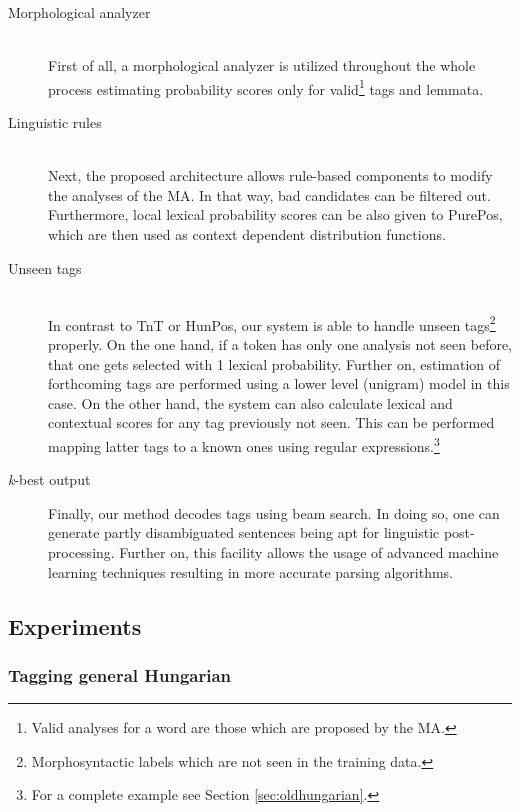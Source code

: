 \begin{description}
  \item[Morphological analyzer] \hfill \\
  First of all, a morphological analyzer is utilized throughout the whole process estimating probability scores only for valid\footnote{Valid analyses for a word are those which are proposed by the MA.} tags and lemmata.
  \item[Linguistic rules] \hfill \\
  Next, the proposed architecture allows rule-based components to modify the analyses of the MA. In that way, bad candidates can be filtered out. Furthermore, local lexical probability scores can be also given to PurePos, which are then used as context dependent distribution functions. 
  \item[Unseen tags] \hfill \\ 
  In contrast to TnT or HunPos, our system is able to handle unseen tags\footnote{Morphosyntactic labels which are not seen in the training data.} properly. On the one hand, if a token has only one analysis not seen before, that one gets selected with 1 lexical probability. Further on, estimation of forthcoming tags are performed using a lower level (unigram) model in this case. On the other hand, the system can also calculate lexical and contextual scores for any tag previously not seen. This can be performed mapping latter tags to a known ones using regular expressions.\footnote{For a complete example see Section \ref{sec:oldhungarian}.}
  \item[\emph{k}-best output] Finally, our method decodes tags using beam search. In doing so, one can generate partly disambiguated sentences being apt for linguistic post-processing. Further on, this facility allows the usage of advanced machine learning techniques resulting in more accurate parsing algorithms.
\end{description}


\subsection{Experiments}


\subsubsection{Tagging general Hungarian}

